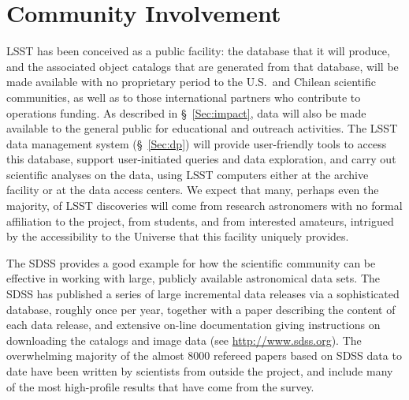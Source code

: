\section{Community Involvement}
\label{Sec:community}

LSST has been conceived as a public facility: the database that it will
produce, and the associated object catalogs that are generated from that
database, will be made available with no proprietary period to the
U.S.\ and Chilean scientific communities, as well as to those
international partners who contribute to operations funding.  As
described in \S~\ref{Sec:impact}, data will also be made available to
the general public for educational and outreach activities.
The LSST data management
system (\S~\ref{Sec:dp}) will provide user-friendly tools to access this database, support
user-initiated queries and data exploration, and carry out scientific analyses on the
data, using LSST computers either at the archive facility
or at the data access centers.
We expect that many, perhaps even the majority,
of LSST discoveries will come from research astronomers with no formal
affiliation to the project, from students, and from interested amateurs,
intrigued by the accessibility to the Universe that this facility uniquely
provides.

The SDSS provides a good example for how the scientific
community can be effective in working with large, publicly available
astronomical data sets. The SDSS has published a series of large incremental
data releases via a sophisticated database, roughly once per year, together with
a paper describing the content of each data release, and extensive on-line
documentation giving instructions on downloading the catalogs and image data
(see \url{http://www.sdss.org}). The overwhelming majority of the almost
8000 refereed papers based
on SDSS data to date have been written by scientists from outside
the project, and  include many of the most high-profile results that have come
from the survey.

